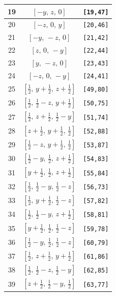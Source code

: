 \documentclass[fleqn,8pt]{jsarticle}
\begin{document}
\begin{longtable}{ccc}
19 & $\left[ - y,\, z,\, 0 \right]$ & {\tt [19,47]} \\ \hline
20 & $\left[ - z,\, 0,\, y \right]$ & {\tt [20,46]} \\ \hline
21 & $\left[ - y,\, - z,\, 0 \right]$ & {\tt [21,42]} \\ \hline
22 & $\left[ z,\, 0,\, - y \right]$ & {\tt [22,44]} \\ \hline
23 & $\left[ y,\, - z,\, 0 \right]$ & {\tt [23,43]} \\ \hline
24 & $\left[ - z,\, 0,\, - y \right]$ & {\tt [24,41]} \\ \hline
25 & $\left[ \frac{1}{2},\, y + \frac{1}{2},\, z + \frac{1}{2} \right]$ & {\tt [49,80]} \\ \hline
26 & $\left[ \frac{1}{2},\, \frac{1}{2} - z,\, y + \frac{1}{2} \right]$ & {\tt [50,75]} \\ \hline
27 & $\left[ \frac{1}{2},\, z + \frac{1}{2},\, \frac{1}{2} - y \right]$ & {\tt [51,74]} \\ \hline
28 & $\left[ z + \frac{1}{2},\, y + \frac{1}{2},\, \frac{1}{2} \right]$ & {\tt [52,88]} \\ \hline
29 & $\left[ \frac{1}{2} - z,\, y + \frac{1}{2},\, \frac{1}{2} \right]$ & {\tt [53,87]} \\ \hline
30 & $\left[ \frac{1}{2} - y,\, \frac{1}{2},\, z + \frac{1}{2} \right]$ & {\tt [54,83]} \\ \hline
31 & $\left[ y + \frac{1}{2},\, \frac{1}{2},\, z + \frac{1}{2} \right]$ & {\tt [55,84]} \\ \hline
32 & $\left[ \frac{1}{2},\, \frac{1}{2} - y,\, \frac{1}{2} - z \right]$ & {\tt [56,73]} \\ \hline
33 & $\left[ \frac{1}{2},\, y + \frac{1}{2},\, \frac{1}{2} - z \right]$ & {\tt [57,82]} \\ \hline
34 & $\left[ \frac{1}{2},\, \frac{1}{2} - y,\, z + \frac{1}{2} \right]$ & {\tt [58,81]} \\ \hline
35 & $\left[ y + \frac{1}{2},\, \frac{1}{2},\, \frac{1}{2} - z \right]$ & {\tt [59,78]} \\ \hline
36 & $\left[ \frac{1}{2} - y,\, \frac{1}{2},\, \frac{1}{2} - z \right]$ & {\tt [60,79]} \\ \hline
37 & $\left[ \frac{1}{2},\, z + \frac{1}{2},\, y + \frac{1}{2} \right]$ & {\tt [61,86]} \\ \hline
38 & $\left[ \frac{1}{2},\, \frac{1}{2} - z,\, \frac{1}{2} - y \right]$ & {\tt [62,85]} \\ \hline
39 & $\left[ z + \frac{1}{2},\, \frac{1}{2} - y,\, \frac{1}{2} \right]$ & {\tt [63,77]} \\ \hline

\end{longtable}
\end{document}
